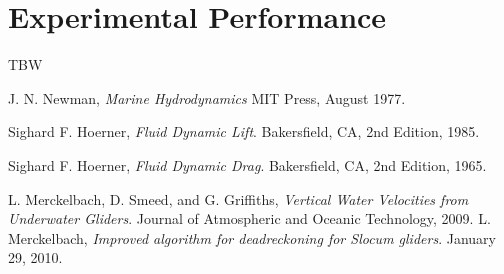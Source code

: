 \documentclass[10pt]{article}
\begin{document}
\section{Experimental Performance}
TBW
%
%






\begin{thebibliography}{9}


  J. N. Newman,
  \emph{Marine Hydrodynamics}
  MIT Press, August 1977.

  Sighard F. Hoerner,
  \emph{Fluid Dynamic Lift}.
  Bakersfield, CA, 2nd Edition, 1985.

Sighard F. Hoerner,
  \emph{Fluid Dynamic Drag}.
  Bakersfield, CA, 2nd Edition, 1965.

  L. Merckelbach, D. Smeed, and G. Griffiths,
  \emph{Vertical Water Velocities from Underwater Gliders}.
  Journal of Atmospheric and Oceanic Technology, 2009.
  L. Merckelbach,
  \emph{Improved algorithm for deadreckoning for Slocum gliders}.
  January 29, 2010.

\end{thebibliography}
\end{document}

